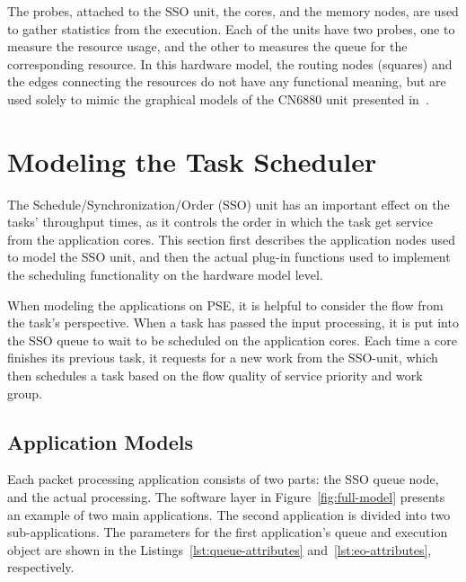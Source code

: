 The probes, attached to the SSO unit, the cores, and the memory nodes, are used to gather statistics from the execution. Each of the units have two probes, one to measure the resource usage, and the other to measures the queue for the corresponding resource. In this hardware model, the routing nodes (squares) and the edges connecting the resources do not have any functional meaning, but are used solely to mimic the graphical models of the CN6880 unit presented in~\cite{cavium:2010:fundamentals}.

\section{Modeling the Task Scheduler}
\label{sec:modeling-task-scheduler}
The Schedule/Synchronization/Order (SSO) unit has an important effect on the tasks' throughput times, as it controls the order in which the task get service from the application cores. This section first describes the application nodes used to model the SSO unit, and then the actual plug-in functions used to implement the scheduling functionality on the hardware model level.







When modeling the applications on PSE, it is helpful to consider the flow from the task's perspective. When a task has passed the input processing, it is put into the SSO queue to wait to be scheduled on the application cores. Each time a core finishes its previous task, it requests for a new work from the SSO-unit, which then schedules a task based on the flow quality of service  priority and work group.

\subsection{Application Models}
\label{application-models}

Each packet processing application consists of two parts: the SSO queue node, and the actual processing. The software layer in Figure~\ref{fig:full-model} presents an example of two main applications. The second application is divided into two sub-applications. The parameters for the first application's queue and execution object are shown in the Listings~\ref{lst:queue-attributes} and~\ref{lst:eo-attributes}, respectively.


